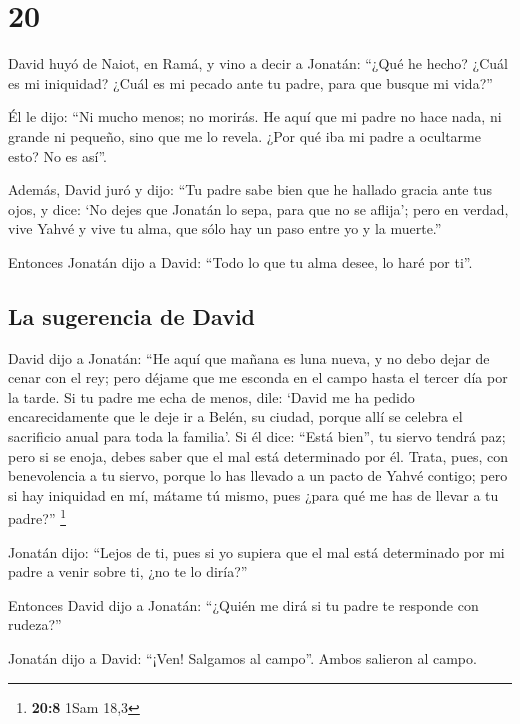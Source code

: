 \hypertarget{section-19}{%
\section{20}\label{section-19}}

 David huyó de Naiot, en Ramá, y vino a decir a Jonatán:
``¿Qué he hecho? ¿Cuál es mi iniquidad? ¿Cuál es mi pecado ante tu
padre, para que busque mi vida?''

 Él le dijo: ``Ni mucho menos; no morirás. He aquí que mi
padre no hace nada, ni grande ni pequeño, sino que me lo revela. ¿Por
qué iba mi padre a ocultarme esto? No es así''.

 Además, David juró y dijo: ``Tu padre sabe bien que he
hallado gracia ante tus ojos, y dice: `No dejes que Jonatán lo sepa,
para que no se aflija'; pero en verdad, vive Yahvé y vive tu alma, que
sólo hay un paso entre yo y la muerte.''

 Entonces Jonatán dijo a David: ``Todo lo que tu alma
desee, lo haré por ti''.

\hypertarget{la-sugerencia-de-david}{%
\subsection{La sugerencia de David}\label{la-sugerencia-de-david}}

 David dijo a Jonatán: ``He aquí que mañana es luna nueva,
y no debo dejar de cenar con el rey; pero déjame que me esconda en el
campo hasta el tercer día por la tarde.  Si tu padre me
echa de menos, dile: `David me ha pedido encarecidamente que le deje ir
a Belén, su ciudad, porque allí se celebra el sacrificio anual para toda
la familia'.  Si él dice: ``Está bien'', tu siervo tendrá
paz; pero si se enoja, debes saber que el mal está determinado por él.
 Trata, pues, con benevolencia a tu siervo, porque lo has
llevado a un pacto de Yahvé contigo; pero si hay iniquidad en mí, mátame
tú mismo, pues ¿para qué me has de llevar a tu padre?'' \footnote{\textbf{20:8}
  1Sam 18,3}

 Jonatán dijo: ``Lejos de ti, pues si yo supiera que el
mal está determinado por mi padre a venir sobre ti, ¿no te lo diría?''

 Entonces David dijo a Jonatán: ``¿Quién me dirá si tu
padre te responde con rudeza?''

 Jonatán dijo a David: ``¡Ven! Salgamos al campo''. Ambos
salieron al campo.

